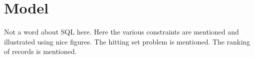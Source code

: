 \section{Model}
Not a word about SQL here. Here the various constraints are mentioned and illustrated using nice figures. The hitting set problem is mentioned. The ranking of records is mentioned.